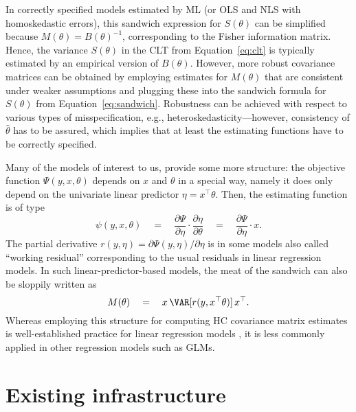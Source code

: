 \documentclass{Z}
\begin{document}
In correctly specified models estimated by ML (or OLS and NLS with homoskedastic errors),
this sandwich expression for $S(\theta)$ can be simplified because $M(\theta) = B(\theta)^{-1}$,
corresponding to the Fisher information matrix. Hence, the variance $S(\theta)$ in the CLT from
Equation~\ref{eq:clt} is typically estimated by an empirical version of $B(\theta)$.
However, more robust covariance matrices can be obtained by employing estimates
for $M(\theta)$ that are consistent under weaker assumptions
\citep[see e.g.,][]{hac:Lumley+Heagerty:1999}
and plugging these into the sandwich formula for $S(\theta)$ from Equation~\ref{eq:sandwich}.
Robustness can be achieved with respect to various types of misspecification, e.g.,
heteroskedasticity---however, consistency of $\hat \theta$ has to be assured, which implies that
at least the estimating functions have to be correctly specified.

Many of the models of interest to us, provide some more structure: the objective function
$\Psi(y, x, \theta)$ depends on $x$ and $\theta$ in a special way, namely it does only
depend on the univariate linear predictor $\eta = x^\top \theta$. Then, the estimating function is of type
\begin{equation} \label{eq:estfunHC}
  \psi(y, x, \theta)
    \quad = \quad \frac{\partial \Psi}{\partial \eta} \cdot \frac{\partial \eta}{\partial \theta}
    \quad = \quad \frac{\partial \Psi}{\partial \eta} \cdot x.
\end{equation}
The partial derivative $r(y, \eta) = \partial \Psi(y, \eta) / \partial \eta$ is in some models
also called ``working residual'' corresponding to the usual residuals in linear regression models.
In such linear-predictor-based models, the meat of the sandwich can also be sloppily written as
\begin{equation} \label{eq:objHC}
  M(\theta) \quad = \quad x \, \VAR[ r(y, x^\top \theta) ] \, x^\top.
\end{equation}
Whereas employing this structure for computing HC covariance matrix estimates is
well-established practice for linear regression
models \citep[see][among others]{hac:MacKinnon+White:1985,hac:Long+Ervin:2000},
it is less commonly applied in other regression models such as GLMs.


\section[Existing R infrastructure]{Existing  infrastructure} \label{sec:R}
\end{document}
